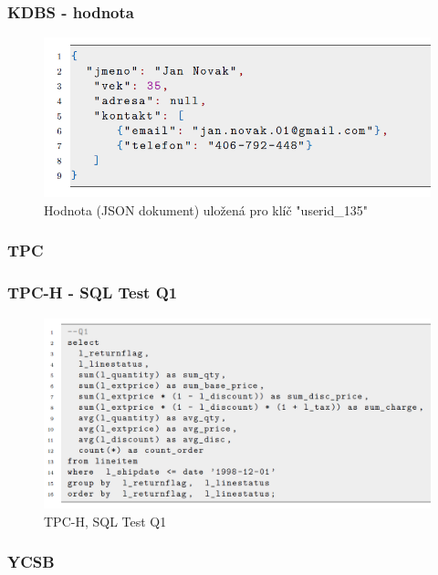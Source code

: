 \documentclass{beamer}
\begin{document}
	\begin{frame}
		\frametitle{KDBS - hodnota}		
		\begin{figure}
			\centering
			\includegraphics[scale=0.53]{Figures/hodnota_json.PNG}
			\caption{Hodnota (JSON dokument) uložená pro klíč "userid\_135"}
		\end{figure}
	\end{frame}
	
	\begin{frame}
		\frametitle{TPC}
	\end{frame}
	
	\begin{frame}
		\frametitle{TPC-H - SQL Test Q1}
		\begin{figure}
			\centering
			\includegraphics[scale=0.4]{Figures/tpc_test.PNG}
			\caption{TPC-H, SQL Test Q1~\cite{tpc-h-sql, tpc-h-index}}
		\end{figure}
	\end{frame}
	
	\begin{frame}
		\frametitle{YCSB}
	\end{frame}
	
\end{document}
